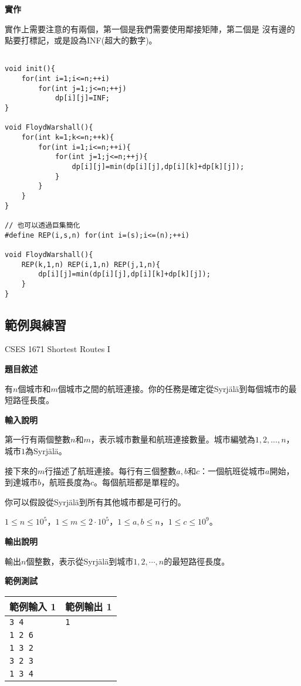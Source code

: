     \textbf{實作}

    實作上需要注意的有兩個，第一個是我們需要使用鄰接矩陣，第二個是
    沒有邊的點要打標記，或是設為INF(超大的數字)。

\begin{lstlisting}[caption=Floyd-Warshall 算法]

void init(){
    for(int i=1;i<=n;++i)
        for(int j=1;j<=n;++j)
            dp[i][j]=INF;
}

void FloydWarshall(){
    for(int k=1;k<=n;++k){
        for(int i=1;i<=n;++i){
            for(int j=1;j<=n;++j){
                dp[i][j]=min(dp[i][j],dp[i][k]+dp[k][j]);
            }
        }
    }
}

// 也可以透過巨集簡化
#define REP(i,s,n) for(int i=(s);i<=(n);++i)

void FloydWarshall(){
    REP(k,1,n) REP(i,1,n) REP(j,1,n){
        dp[i][j]=min(dp[i][j],dp[i][k]+dp[k][j]);
    }
}
\end{lstlisting}

    \subsection{範例與練習}

    \problem CSES 1671 Shortest Routes I

    \textbf{題目敘述}

    有$n$個城市和$m$個城市之間的航班連接。你的任務是確定從Syrjälä到每個城市的最短路徑長度。

    \textbf{輸入說明}

    第一行有兩個整數$n$和$m$，表示城市數量和航班連接數量。城市編號為$1,2,...,n$，城市$1$為Syrjälä。

    接下來的$m$行描述了航班連接。每行有三個整數$a, b$和$c$：一個航班從城市$a$開始，
    到達城市$b$，航班長度為$c$。每個航班都是單程的。

    你可以假設從Syrjälä到所有其他城市都是可行的。

    $1 \leq n \leq 10^5$，$1 \leq m \leq 2 \cdot 10^5$，$1 \leq a, b \leq n$，$1 \leq c \leq 10^9$。

    \textbf{輸出說明}

    輸出$n$個整數，表示從Syrjälä到城市$1,2, \cdots ,n$的最短路徑長度。

    \textbf{範例測試}

    \begin{tabular}{|m{7cm}|m{7cm}|}
        \hline
        範例輸入 1 & 範例輸出 1 \\
        \hline
        \verb|3 4|  & \verb|1| \\
        \verb|1 2 6|  &\\
        \verb|1 3 2|  &\\
        \verb|3 2 3|  &\\
        \verb|1 3 4|  &\\
        \hline
    \end{tabular}

